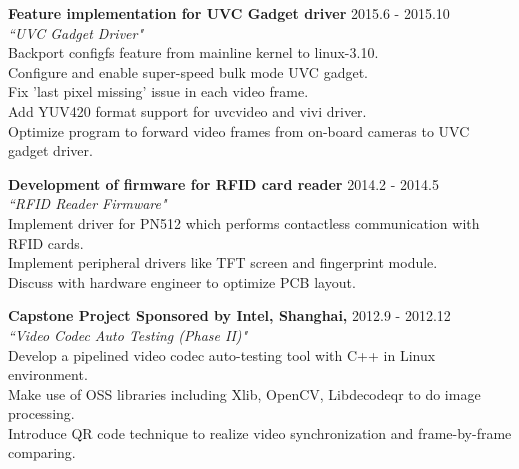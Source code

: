 \documentclass{res}
\begin{document}
\begin{resume}
   {\bf Feature implementation for UVC Gadget driver} {\hfill 2015.6 - 2015.10\\}
   \emph {``UVC Gadget Driver"}\\
Backport configfs feature from mainline kernel to linux-3.10.\\
Configure and enable super-speed bulk mode UVC gadget.\\
Fix 'last pixel missing' issue in each video frame.\\
Add YUV420 format support for uvcvideo and vivi driver.\\
Optimize program to forward video frames from on-board cameras to UVC gadget driver.

   {\bf Development of firmware for RFID card reader} {\hfill 2014.2 - 2014.5\\}
   \emph {``RFID Reader Firmware"}\\
Implement driver for PN512 which performs contactless communication with RFID cards.\\
Implement peripheral drivers like TFT screen and fingerprint module.\\
Discuss with hardware engineer to optimize PCB layout.

   {\bf Capstone Project Sponsored by Intel, Shanghai,} {\hfill 2012.9 - 2012.12\\}
   \emph {``Video Codec Auto Testing (Phase II)"}\\
Develop a pipelined video codec auto-testing tool with C++ in Linux environment.\\
Make use of OSS libraries including Xlib, OpenCV, Libdecodeqr to do image processing.\\
Introduce QR code technique to realize video synchronization and frame-by-frame comparing.
%



\end{resume}
\end{document}
